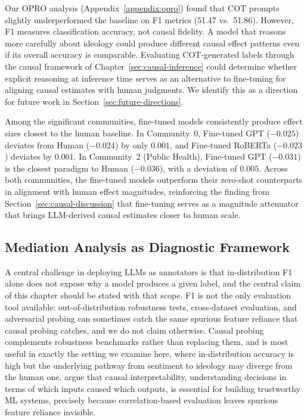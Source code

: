Our OPRO analysis (Appendix~\ref{appendix:opro}) found that COT prompts slightly underperformed the baseline on F1 metrics (51.47 vs.\ 51.86). However, F1 measures classification accuracy, not causal fidelity. A model that reasons more carefully about ideology could produce different causal effect patterns even if its overall accuracy is comparable. Evaluating COT-generated labels through the causal framework of Chapter~\ref{sec:causal-inference} could determine whether explicit reasoning at inference time serves as an alternative to fine-tuning for aligning causal estimates with human judgments. We identify this as a direction for future work in Section~\ref{sec:future-directions}.

Among the significant communities, fine-tuned models consistently produce effect sizes closest to the human baseline. In Community~0, Fine-tuned GPT ($-0.025$) deviates from Human ($-0.024$) by only $0.001$, and Fine-tuned RoBERTa ($-0.023$) deviates by $0.001$. In Community~2 (Public Health), Fine-tuned GPT ($-0.031$) is the closest paradigm to Human ($-0.036$), with a deviation of $0.005$. Across both communities, the fine-tuned models outperform their zero-shot counterparts in alignment with human effect magnitudes, reinforcing the finding from Section~\ref{sec:causal-discussion} that fine-tuning serves as a magnitude attenuator that brings LLM-derived causal estimates closer to human scale.

\subsection{Mediation Analysis as Diagnostic Framework}

A central challenge in deploying LLMs as annotators is that in-distribution F1 alone does not expose why a model produces a given label, and the central claim of this chapter should be stated with that scope. F1 is not the only evaluation tool available: out-of-distribution robustness tests, cross-dataset evaluation, and adversarial probing can sometimes catch the same spurious feature reliance that causal probing catches, and we do not claim otherwise. Causal probing complements robustness benchmarks rather than replacing them, and is most useful in exactly the setting we examine here, where in-distribution accuracy is high but the underlying pathway from sentiment to ideology may diverge from the human one. \citet{moraffah2020causal} argue that causal interpretability, understanding decisions in terms of which inputs caused which outputs, is essential for building trustworthy ML systems, precisely because correlation-based evaluation leaves spurious feature reliance invisible.

